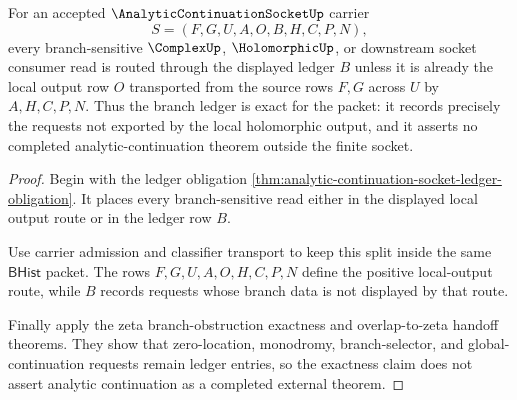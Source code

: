 \begin{theorem}
\label{thm:analytic-continuation-socket-branch-ledger-exactness}
For an accepted $\AnalyticContinuationSocketUp$ carrier
$$
S=(F,G,U,A,O,B,H,C,P,N),
$$
every branch-sensitive $\ComplexUp$, $\HolomorphicUp$, or downstream socket consumer read is routed through the displayed ledger $B$ unless it is already the local output row $O$ transported from the source rows $F,G$ across $U$ by $A,H,C,P,N$. Thus the branch ledger is exact for the packet: it records precisely the requests not exported by the local holomorphic output, and it asserts no completed analytic-continuation theorem outside the finite socket.
\end{theorem}
\begin{proof}
Begin with the ledger obligation \autoref{thm:analytic-continuation-socket-ledger-obligation}. It places every branch-sensitive read either in the displayed local output route or in the ledger row $B$.

Use carrier admission and classifier transport to keep this split inside the same $\mathsf{BHist}$ packet. The rows $F,G,U,A,O,H,C,P,N$ define the positive local-output route, while $B$ records requests whose branch data is not displayed by that route.

Finally apply the zeta branch-obstruction exactness and overlap-to-zeta handoff theorems. They show that zero-location, monodromy, branch-selector, and global-continuation requests remain ledger entries, so the exactness claim does not assert analytic continuation as a completed external theorem.
\end{proof}

